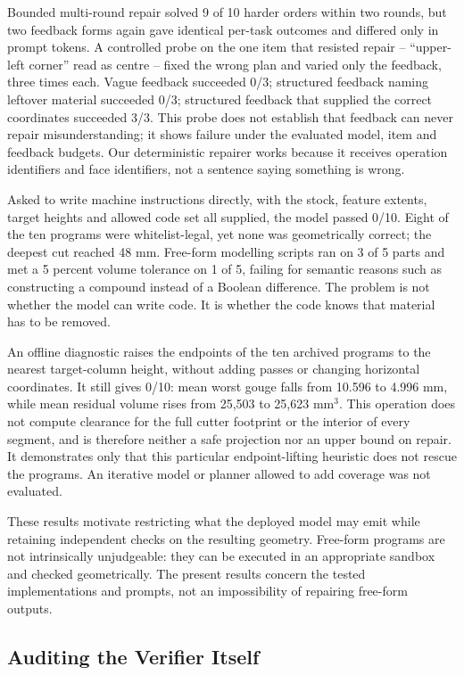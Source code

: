 Bounded multi-round repair solved 9 of 10 harder orders within two rounds, but two feedback forms again gave identical per-task outcomes and differed only in prompt tokens. A controlled probe on the one item that resisted repair -- ``upper-left corner'' read as centre -- fixed the wrong plan and varied only the feedback, three times each. Vague feedback succeeded 0/3; structured feedback naming leftover material succeeded 0/3; structured feedback that supplied the correct coordinates succeeded 3/3. This probe does not establish that feedback can never repair misunderstanding; it shows failure under the evaluated model, item and feedback budgets. Our deterministic repairer works because it receives operation identifiers and face identifiers, not a sentence saying something is wrong.

Asked to write machine instructions directly, with the stock, feature extents, target heights and allowed code set all supplied, the model passed 0/10. Eight of the ten programs were whitelist-legal, yet none was geometrically correct; the deepest cut reached 48 mm. Free-form modelling scripts ran on 3 of 5 parts and met a 5 percent volume tolerance on 1 of 5, failing for semantic reasons such as constructing a compound instead of a Boolean difference. The problem is not whether the model can write code. It is whether the code knows that material has to be removed.

An offline diagnostic raises the endpoints of the ten archived programs to the nearest target-column height, without adding passes or changing horizontal coordinates. It still gives 0/10: mean worst gouge falls from 10.596 to 4.996 mm, while mean residual volume rises from 25,503 to 25,623 mm$^3$. This operation does not compute clearance for the full cutter footprint or the interior of every segment, and is therefore neither a safe projection nor an upper bound on repair. It demonstrates only that this particular endpoint-lifting heuristic does not rescue the programs. An iterative model or planner allowed to add coverage was not evaluated.

These results motivate restricting what the deployed model may emit while retaining independent checks on the resulting geometry. Free-form programs are not intrinsically unjudgeable: they can be executed in an appropriate sandbox and checked geometrically. The present results concern the tested implementations and prompts, not an impossibility of repairing free-form outputs.

\subsection{Auditing the Verifier Itself}

